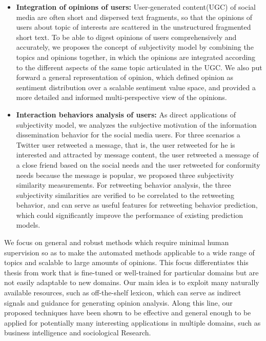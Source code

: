 \begin{eabstract}
\begin{itemize}
\item \textbf{Integration of opinions of users:} User-generated content(UGC) of social media are often short and dispersed text fragments, so that the opinions of users about topic of interests are scattered in the unstructured fragmented short text. To be able to digest opinions of users comprehensively and accurately, we proposes the concept of subjectivity model by combining the topics and opinions together, in which the opinions are integrated according to the different aspects of the same topic articulated in the UGC. We also put forward a general representation of opinion, which defined opinion as sentiment distribution over a scalable sentiment value space, and provided a more detailed and informed multi-perspective view of the opinions.
\item \textbf{Interaction behaviors analysis of users:} As direct applications of subjectivity model, we analyzes the subjective motivation of the information dissemination behavior for the social media users. For three scenarios a Twitter user retweeted a message, that is, the user retweeted for he is interested and attracted by message content, the user retweeted a message of a close friend based on the social needs and the user retweeted for conformity needs because the message is popular, we proposed three subjectivity similarity measurements. For retweeting behavior analysis, the three subjectivity similarities are verified to be correlated to the retweeting behavior, and can serve as useful features for retweeting behavior prediction, which could significantly improve the performance of existing prediction models.
\end{itemize}

We focus on general and robust methods which require minimal human supervision so as to make the automated methods applicable to a wide range of topics and scalable to large amounts of opinions. This focus differentiates this thesis from work that is fine-tuned or well-trained for particular domains but are not easily adaptable to new domains. Our main idea is to exploit many naturally available resources, such as off-the-shelf lexicon, which can serve as indirect signals and guidance for generating opinion analysis. Along this line, our proposed techniques have been shown to be effective and general enough to be applied for potentially many interesting applications in multiple domains, such as business intelligence and sociological Research.
\end{eabstract}

